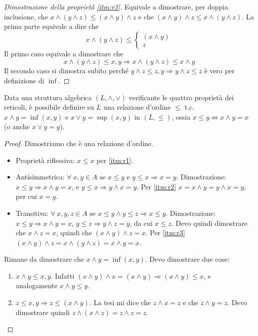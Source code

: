 \begin{proof}[Dimostrazione della propriet\`a \ref{itm:r3}]
Equivale a dimostrare, per doppia inclusione, che $x \wedge ( y \wedge z) \leq (x \wedge y) \wedge z$ e che $(x \wedge y) \wedge z \leq x \wedge ( y \wedge z)$. La prima parte equivale a dire che
\[
x \wedge (y \wedge z) \leq 
\begin{cases}
(x \wedge y) \\
 z
 \end{cases}
\]
Il primo caso equivale a dimostrare che
\[
x \wedge (y \wedge z) \leq x, y \Rightarrow x \wedge (y \wedge z) \leq x \wedge y
\]
Il secondo caso si dimostra subito perch\'e $y \wedge z \leq z, y \Rightarrow y \wedge z \leq z$ \`e vero per definizione di $\inf$. 
\end{proof}

\begin{theorem}
Data una struttura algebrica $(L, \wedge, \vee)$ verificante le quattro propriet\`a dei reticoli, \`e possibile definire su $L$ una relazione d'ordine $\le$ t.c. $ x \wedge y = \inf(x,y) $ e $ x \vee y = \sup(x,y) $ in $ (L, \le)$, ossia $x \le y \Leftrightarrow x \wedge y = x $ (o anche $ x \vee y = y$).
\end{theorem}
\begin{proof}
Dimostriamo che \`e una relazione d'ordine.
\begin{itemize}
    \item Propriet\`a riflessiva: $x \le x$ per \ref{itm:r1}.
    \item Antisimmetrica: $\forall \ x, y \in A \text{ se } x \leq y \text{ e }  y \leq x \Rightarrow x = y$. Dimostrazione: $x \le y \Rightarrow x \wedge y = x$, e $y \le x \Rightarrow y \wedge x = y$. Per \ref{itm:r2} $x = x \wedge y = y \wedge x = y$, per cui $x = y$.
    \item Transitiva: $\forall \ x, y, z \in A \text{ se } x \leq y \land y \leq z \Rightarrow x \leq y$. Dimostrazione: $x \le y \Rightarrow x \wedge y = x$, $y \le z \Rightarrow y \wedge z = y$, da cui $x \le z$. Devo quindi dimostrare che $x \wedge z = x$, quindi che $(x \wedge y) \wedge z = x$. Per \ref{itm:r3} $(x \wedge y) \wedge z = x \wedge (y \wedge z) = x \wedge y = x$. 
\end{itemize}
Rimane da dimostrare che $x \wedge y = \inf(x,y)$. Devo dimostrare due cose:
\begin{enumerate}
    \item $x \wedge y \le x, y$. Infatti $(x \wedge y) \wedge x = (x \wedge y) \Rightarrow (x \wedge y) \le x$, e analogamente $x \wedge y \le y$.
    \item $z \le x, y \Rightarrow z \le (x \wedge y)$. La tesi mi dice che $z \wedge x = z$ e che $z \wedge y = z$. Devo dimostrare quindi $z \wedge (x \wedge z) = z \wedge z = z$.
\end{enumerate}
\end{proof}

